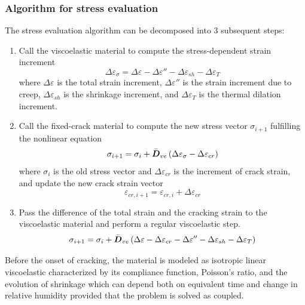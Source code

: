 \documentclass[a4paper]{article}
\newcommand{\mbf}[1]{\mbox{\boldmath$#1$}}
\begin{document}
\subsubsection*{Algorithm for stress evaluation}
%
The stress evaluation algorithm can be decomposed into 3 subsequent steps:
%
\begin{enumerate}

\item Call the viscoelastic material to compute the stress-dependent strain increment
\begin{equation}
\Delta \varepsilon_\sigma  = \Delta \varepsilon - \Delta \varepsilon''
- \Delta \varepsilon_{sh} - \Delta \varepsilon_T  
\end{equation}
where $\Delta \varepsilon$ is the total strain increment, $\Delta
\varepsilon''$ is the strain increment due to creep, $\Delta
\varepsilon_{sh}$ is the shrinkage increment, and $\Delta
\varepsilon_T$ is the thermal dilation increment.

\item Call the fixed-crack material to compute the new stress vector
  $\sigma_{i+1}$ 
  fulfilling the nonlinear equation
%
  \begin{equation}
\sigma_{i+1} = \sigma_{i} + \bar{\mbf{D}}_{ve} \left ( \Delta
\varepsilon_\sigma - \Delta
\varepsilon_{cr} \right)
  \end{equation}
where $\sigma_{i}$ is the old stress vector and $\Delta
\varepsilon_{cr}$ is the increment of crack strain, and update the new crack strain vector 
  \begin{equation}
\varepsilon_{cr,i+1} = \varepsilon_{cr,i} + \Delta \varepsilon_{cr} 
  \end{equation}
  
\item Pass the difference of the total strain and the cracking strain
  to the viscoelastic material and perform a regular viscoelastic step.
%
\begin{equation}  
\sigma_{i+1} = \sigma_{i} + \bar{\mbf{D}}_{ve} \left ( \Delta
\varepsilon - \Delta \varepsilon_{cr}  - \Delta \varepsilon''
- \Delta \varepsilon_{sh} - \Delta \varepsilon_T  \right)
\end{equation}
%
\end{enumerate}  


\vspace{1em}
Before the onset of cracking, the material is modeled as isotropic
linear viscoelastic characterized by its compliance function, Poisson's
ratio, and the evolution of shrinkage which can depend both on
equivalent time and change in relative humidity provided that the
problem is solved as coupled.
\end{document}
